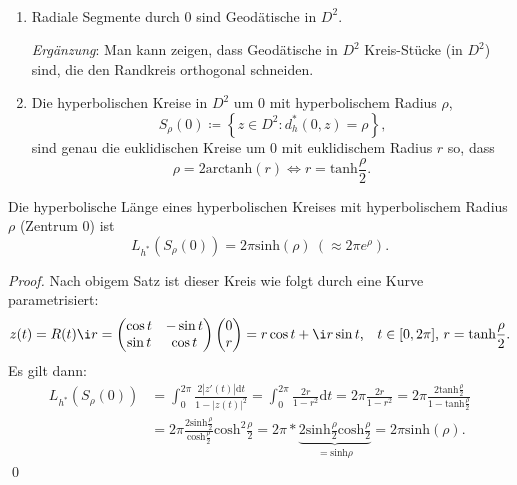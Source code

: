 \begin{deduction}
  \
  \begin{enumerate}
    \item Radiale Segmente durch \( 0 \) sind Geodätische in \( D^2 \).

    \emph{Ergänzung}: Man kann zeigen, dass Geodätische in \( D^2 \) Kreis-Stücke (in \( D^2 \)) sind, die den Randkreis orthogonal schneiden.

    \item Die hyperbolischen Kreise in \( D^2 \) um \( 0 \) mit hyperbolischem Radius \( \rho \),
    \begin{equation*}
      S_\rho(0) \coloneqq \left \{ z \in D^2 : d_h^\ast(0,z) = \rho \right \}\text{,}
    \end{equation*}
    sind genau die euklidischen Kreise um \( 0 \) mit euklidischem Radius \( r \) so, dass
    \begin{equation*}
      \rho = 2 \text{arctanh}(r) \Leftrightarrow r = \text{tanh}\frac{\rho}{2}\text{.}
    \end{equation*}
  \end{enumerate}
\end{deduction}

\begin{remark}[Anwendung]
  Die hyperbolische Länge eines hyperbolischen Kreises mit hyperbolischem Radius \( \rho \) (Zentrum \( 0 \)) ist
  \begin{equation*}
    L_{h^\ast}(S_\rho(0)) = 2\pi\text{sinh}(\rho) \ (\approx 2\pi e^\rho)\text{.}
  \end{equation*}

  \begin{proof}
    Nach obigem Satz ist dieser Kreis wie folgt durch eine Kurve parametrisiert:
    \begin{equation*}
      z(t) = R(t) \i r = \begin{pmatrix}
        \cos t & -\sin t \\
        \sin t & \cos t
      \end{pmatrix}\begin{pmatrix}
        0 \\ r
      \end{pmatrix} = r\cos t + \i r \sin t\text{,}\quad t \in [0,2\pi]\text{,} \ r = \text{tanh}\frac{\rho}{2}\text{.}
    \end{equation*}
    Es gilt dann:
    \begin{align*}
      L_{h^\ast}(S_\rho(0)) &= \int_0^{2\pi} \frac{2\left\vert z'(t) \right\vert\text{d}t}{1-\left\vert z(t) \right\vert^2} = \int_0^{2\pi}\frac{2r}{1-r^2}\text{d}t = 2\pi \frac{2r}{1-r^2} = 2\pi \frac{2 \text{tanh}\frac{\rho}{2}}{1-\text{tanh}\frac{\rho}{2}} \\
      &= 2\pi \frac{2\text{sinh}\frac{\rho}{2}}{\text{cosh}\frac{\rho}{2}}\text{cosh}^2\frac{\rho}{2} = 2\pi * \underbrace{2\text{sinh}\frac{\rho}{2}\text{cosh}\frac{\rho}{2}}_{= \text{sinh}\rho} = 2\pi \text{sinh}(\rho)\text{.}
    \end{align*} \qed
  \end{proof}
\end{remark}

